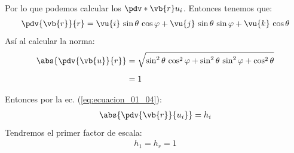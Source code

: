 Por lo que podemos calcular los $\pdv*{\vb{r}}{u_{i}}$. Entonces tenemos que:
\begin{align*}
\pdv{\vb{r}}{r} = \vu{i} \, \sin \theta \, \cos \varphi + \vu{j} \, \sin \theta \, \sin \varphi + \vu{k} \, \cos \theta
\end{align*}
Así al calcular la norma:
\begin{align*}
\abs{\pdv{\vb{u}}{r}} &= \sqrt{\sin^{2} \theta \, \cos^{2} \varphi + \sin^{2} \theta \, \sin^{2} \varphi + \cos^{2} \theta} \\[0.5em]
&= 1
\end{align*}

Entonces por la ec. (\ref{eq:ecuacion_01_04}):
\begin{align*}
\abs{\pdv{\vb{r}}{u_{i}}} = h_{i}
\end{align*}
Tendremos el primer factor de escala:
\begin{align*}
h_{1} = h_{r} = 1
\end{align*}


